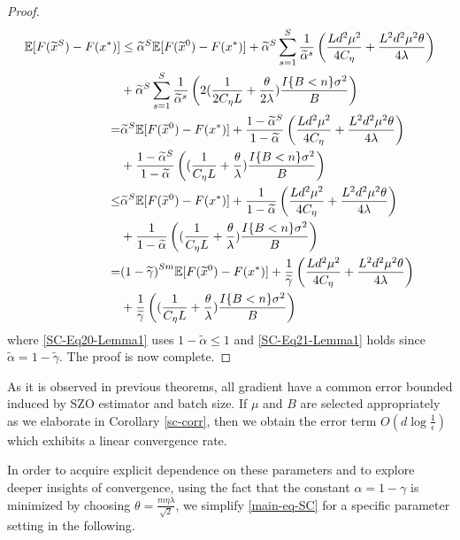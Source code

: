 \documentclass{article}
\newcommand*{\E}{\mathbb{E}}
\theoremstyle{definition}
\theoremstyle{remark}
\begin{document}
{{\begin{proof}
\begin{align}
\E[F(\widetilde{x}^S) - F(x^*)] & \leq \widetilde{\alpha}^{S} \E[F(\widetilde{x}^0) - F({x}^*)] +\widetilde{\alpha}^{S} \sum_{s=1}^S \frac{1}{\widetilde{\alpha}^s}\left(\frac{Ld^2\mu^2}{4C_{\eta}}+\frac{ L^2d^2\mu^2\theta}{4\lambda}\right)\notag\\
&+\widetilde{\alpha}^{S} \sum_{s=1}^S \frac{1}{\widetilde{\alpha}^s}\left(2(\frac{1}{2C_{\eta} L}+\frac{\theta}{2\lambda})\frac{I\{B < n\} \sigma ^2}{B}\right)\notag\\
 =& \widetilde{\alpha}^{S} \E[F(\widetilde{x}^0) - F(x^*)]+\frac{1-\widetilde{\alpha}^S}{1-\widetilde{\alpha}}\left(\frac{Ld^2\mu^2}{4C_{\eta}}+\frac{ L^2d^2\mu^2\theta}{4\lambda}\right)\notag\\
&+ \frac{1-\widetilde{\alpha}^S}{1-\widetilde{\alpha}}\left((\frac{1}{C_{\eta} L}+\frac{\theta}{\lambda})\frac{I\{B < n\} \sigma ^2}{B}\right)\notag\\
 \leq& {\widetilde{\alpha}}^{S} \E[F(\widetilde{x}^0) - F(x^*)]+\frac{1}{1-\widetilde{\alpha}}\left(\frac{Ld^2\mu^2}{4C_{\eta}}+\frac{ L^2d^2\mu^2\theta}{4\lambda}\right)\notag\\
&+ \frac{1}{1-\widetilde{\alpha}}\left((\frac{1}{C_{\eta} L}+\frac{\theta}{\lambda})\frac{I\{B < n\} \sigma ^2}{B}\right)\label{SC-Eq20-Lemma1}\\
 =& {(1-\widetilde{\gamma})}^{Sm} \E[F(\widetilde{x}^0) - F(x^*)]+\frac{1}{{\widetilde{\gamma}}}\left(\frac{Ld^2\mu^2}{4C_{\eta}}+\frac{ L^2d^2\mu^2\theta}{4\lambda}\right)\notag\\
&+ \frac{1}{\widetilde{\gamma}}\left((\frac{1}{C_{\eta} L}+\frac{\theta}{\lambda})\frac{I\{B < n\} \sigma ^2}{B}\right)\label{SC-Eq21-Lemma1}
\end{align}
where \eqref{SC-Eq20-Lemma1} uses $1-\widetilde{\alpha} \leq 1$ and \eqref{SC-Eq21-Lemma1}  holds since $\widetilde{\alpha} = 1-\widetilde{\gamma}$. The proof is now complete.
\end{proof}

}
}
As it is observed in previous theorems, all gradient have a common error bounded induced by SZO estimator and batch size.
If $\mu$  and $B$ are selected appropriately as we elaborate in Corollary \ref{sc-corr}, then we obtain the error term $O(d\log \frac{1}{\epsilon})$ which exhibits a linear convergence rate.

In order
to acquire explicit dependence on these parameters and to explore deeper insights of convergence, using  the fact that the constant $\alpha = 1-\gamma$ is minimized by choosing $\theta = \frac{m\eta\lambda}{\sqrt{2}}$, we
simplify \eqref{main-eq-SC} for a specific parameter setting in the following.
\end{document}

